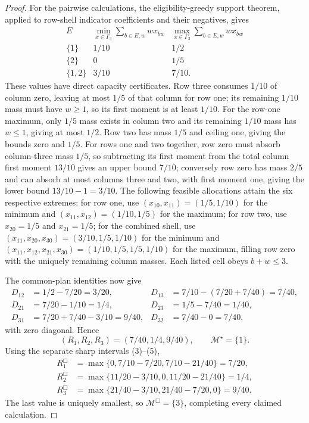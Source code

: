 \documentclass{article}
\begin{document}
\begin{proof}
For the pairwise calculations, the eligibility-greedy support theorem, applied to row-shell indicator coefficients and their negatives, gives
\[
 \begin{array}{c|cc}
 E&\min_{x\in\Gamma_3}\sum_{b\in E,w}wx_{bw}
   &\max_{x\in\Gamma_3}\sum_{b\in E,w}wx_{bw}\\ \hline
 \{1\}&1/10&1/2\\
 \{2\}&0&1/5\\
 \{1,2\}&3/10&7/10.
 \end{array}                                                \tag{6}
\]
These values have direct capacity certificates.  Row three consumes \(1/10\) of column zero, leaving at most \(1/5\) of that column for row one; its remaining \(1/10\) mass must have \(w\ge1\), so its first moment is at least \(1/10\).  For the row-one maximum, only \(1/5\) mass exists in column two and its remaining \(1/10\) mass has \(w\le1\), giving at most \(1/2\).  Row two has mass \(1/5\) and ceiling one, giving the bounds zero and \(1/5\).  For rows one and two together, row zero must absorb column-three mass \(1/5\), so subtracting its first moment from the total column first moment \(13/10\) gives an upper bound \(7/10\); conversely row zero has mass \(2/5\) and can absorb at most columns three and two, with first moment one, giving the lower bound \(13/10-1=3/10\).  The following feasible allocations attain the six respective extremes: for row one, use \((x_{10},x_{11})=(1/5,1/10)\) for the minimum and \((x_{11},x_{12})=(1/10,1/5)\) for the maximum; for row two, use \(x_{20}=1/5\) and \(x_{21}=1/5\); for the combined shell, use \((x_{11},x_{20},x_{30})=(3/10,1/5,1/10)\) for the minimum and \((x_{11},x_{12},x_{21},x_{30})=(1/10,1/5,1/5,1/10)\) for the maximum, filling row zero with the uniquely remaining column masses.  Each listed cell obeys \(b+w\le3\).

The common-plan identities now give
\[
 \begin{aligned}
 D_{12}&=1/2-7/20=3/20,&
 D_{13}&=7/10-(7/20+7/40)=7/40,\\
 D_{21}&=7/20-1/10=1/4,&
 D_{23}&=1/5-7/40=1/40,\\
 D_{31}&=7/20+7/40-3/10=9/40,&
 D_{32}&=7/40-0=7/40,
 \end{aligned}                                             \tag{7}
\]
with zero diagonal.  Hence
\[
 (R_1,R_2,R_3)=(7/40,1/4,9/40),
 \qquad \mathcal M^\star=\{1\}.                           \tag{8}
\]
Using the separate sharp intervals (3)--(5),
\[
 \begin{aligned}
 R_1^{\Box}&=\max\{0,7/10-7/20,7/10-21/40\}=7/20,\\
 R_2^{\Box}&=\max\{11/20-3/10,0,11/20-21/40\}=1/4,\\
 R_3^{\Box}&=\max\{21/40-3/10,21/40-7/20,0\}=9/40.
 \end{aligned}                                             \tag{9}
\]
The last value is uniquely smallest, so \(\mathcal M^{\Box}=\{3\}\), completing every claimed calculation.
\end{proof}
\end{document}

